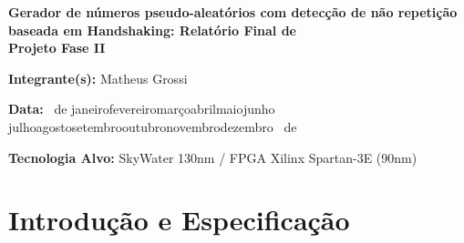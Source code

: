 \documentclass[12pt,a4paper]{article}
\renewcommand{\today}{\number\day\ de \ifcase\month\or
		janeiro\or fevereiro\or março\or abril\or maio\or junho\or
		julho\or agosto\or setembro\or outubro\or novembro\or dezembro\fi
		\ de \number\year}
\begin{document}
	
	\thispagestyle{fancy}
	\vspace*{1.3cm}
	
	{\bfseries\fontsize{24}{28}\selectfont Gerador de números pseudo-aleatórios com detecção de não repetição baseada em Handshaking: Relatório Final de\\Projeto Fase II\par}
	
	\vspace{2.2cm}
	
	{\large\textbf{Integrante(s):} Matheus Grossi\par}
	\vspace{1.2cm}
	{\large\textbf{Data:} \today\par}
	\vspace{1.2cm}
	{\large\textbf{Tecnologia Alvo:} SkyWater 130nm / FPGA Xilinx Spartan-3E (90nm)\par}
	
	\clearpage
	
	\thispagestyle{fancy}
	\tableofcontents
	
	\clearpage
	\setcounter{page}{1}
	
	\section{Introdução e Especificação}
	
\end{document}

